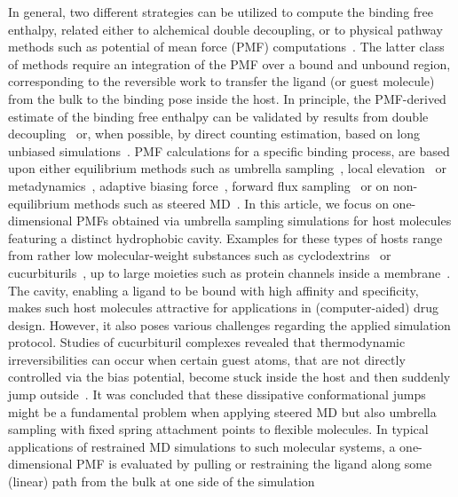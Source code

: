 \documentclass[9pt,lessons,pubversion]{livecoms}
\begin{document}
In general, two different strategies can be utilized to compute the binding free enthalpy, related either to alchemical double decoupling, or to physical pathway methods such as potential of mean force (PMF) computations~\cite{deng2009computations}.
The latter class of methods require an integration of the PMF over a bound and unbound region, corresponding to the reversible work to transfer the ligand (or guest molecule) from the bulk to the binding pose inside the host.
In principle, the PMF-derived estimate of the binding free enthalpy can be validated by results from double decoupling~\cite{markthaler2017molecular, gumbart2012standard} or, when possible, 
by direct counting estimation, based on long unbiased simulations~\cite{pan2017quantitative, baz2018insights}.
PMF calculations for a specific binding process, are based upon either equilibrium methods such as umbrella sampling~\cite{torrie1974monte, torrie1977nonphysical}, local elevation~\cite{huber1994local} 
or metadynamics~\cite{laio2002escaping}, adaptive biasing force~\cite{darve2008adaptive}, forward flux sampling~\cite{allen2009forward} or on non-equilibrium methods such as steered MD~\cite{isralewitz2001steered_1}.
In this article, we focus on one-dimensional PMFs obtained via umbrella sampling simulations for host molecules featuring a distinct hydrophobic cavity.
Examples for these types of hosts range from rather low molecular-weight substances such as cyclodextrins~\cite{del2004cyclodextrins} or cucurbiturils~\cite{velez2012force, velez2013overcoming}, 
up to large moieties such as protein channels inside a membrane~\cite{allen2006ion, allen2006molecular, hub2010g_wham, flood2019atomistic}.
The cavity, enabling a ligand to be bound with high affinity and specificity, makes such host molecules attractive for applications in (computer-aided) drug design.
However, it also poses various challenges regarding the applied simulation protocol.
Studies of cucurbituril complexes revealed that thermodynamic irreversibilities can occur when certain guest atoms, that are not directly controlled via the bias potential, become stuck inside the host and then suddenly jump outside~\cite{velez2012force, velez2013overcoming}.
It was concluded that these dissipative conformational jumps might be a fundamental problem when applying steered MD but also umbrella sampling with fixed spring attachment points to flexible molecules.
In typical applications of restrained MD simulations to such molecular systems, a one-dimensional PMF is evaluated by pulling or restraining the ligand along some (linear) path from the bulk at one side of the simulation 
\end{document}

